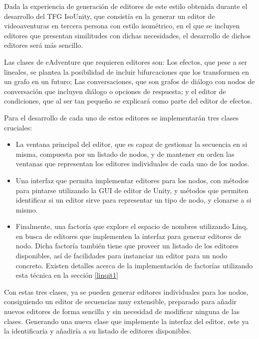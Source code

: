 Dada la experiencia de generación de editores de este estilo obtenida durante el desarrollo del TFG IsoUnity, que consistía en la generar un editor de videoaventuras en tercera persona con estilo isométrico, en el que se incluyen editores que presentan similitudes con dichas necesidades, el desarrollo de dichos editores será más sencillo.

Las clases de eAdventure que requieren editores son: Los efectos, que pese a ser lineales, se plantea la posibilidad de incluir bifurcaciones que los transformen en un grafo en un futuro; Las conversaciones, que son grafos de diálogo con nodos de conversación que incluyen diálogo o opciones de respuesta; y el editor de condiciones, que al ser tan pequeño se explicará como parte del editor de efectos.

Para el desarrollo de cada uno de estos editores se implementarán tres clases cruciales:

\begin{itemize}
	\item La ventana principal del editor, que es capaz de gestionar la secuencia en si misma, compuesta por un listado de nodos, y de mantener en orden las ventanas que representan los editores individuales de cada uno de los nodos.
	
	\item Una interfaz que permita implementar editores para los nodos, con métodos para pintarse utilizando la GUI de editor de Unity, y métodos que permiten identificar si un editor sirve para representar un tipo de nodo, y clonarse a si mismo.
	
	\item Finalmente, una factoría que explore el espacio de nombres utilizando Linq, en busca de editores que implementen la interfaz para generar editores de nodo. Dicha factoría también tiene que proveer un listado de los editores disponibles, así de facilidades para instanciar un editor para un nodo concreto. Existen detalles acerca de la implementación de factorías utilizando esta técnica en la sección \ref{linqit1}
\end{itemize}

Con estas tres clases, ya se pueden generar editores individuales para los nodos, consiguiendo un editor de secuencias muy extensible, preparado para añadir nuevos editores de forma sencilla y sin necesidad de modificar ninguna de las clases. Generando una nueva clase que implemente la interfaz del editor, este ya la identificaría y añadiría a su listado de editores disponibles.

